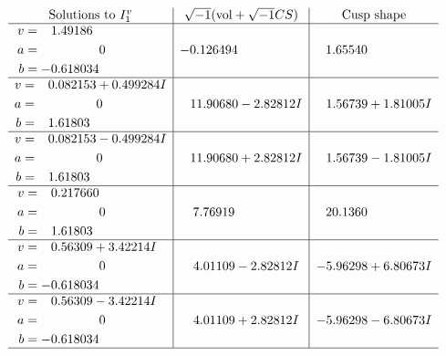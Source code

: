 \documentclass[1p]{elsarticle_modified}
\theoremstyle{definition}
\newcommand{\I}{\sqrt{-1}}
\begin{document}
$$\begin{array}{c|c|c}  
\text{Solutions to }I^v_{1}& \I (\text{vol} + \sqrt{-1}CS) & \text{Cusp shape}\\
 \hline 
\begin{aligned}
v &= \phantom{-}1.49186\phantom{ +0.000000I} \\
a &= \phantom{-0.000000 } 0 \\
b &= -0.618034\phantom{ +0.000000I}\end{aligned}
 & -0.126494\phantom{ +0.000000I} & \phantom{-}1.65540\phantom{ +0.000000I} \\ \hline\begin{aligned}
v &= \phantom{-}0.082153 + 0.499284 I \\
a &= \phantom{-0.000000 } 0 \\
b &= \phantom{-}1.61803\phantom{ +0.000000I}\end{aligned}
 & \phantom{-}11.90680 - 2.82812 I & \phantom{-}1.56739 + 1.81005 I \\ \hline\begin{aligned}
v &= \phantom{-}0.082153 - 0.499284 I \\
a &= \phantom{-0.000000 } 0 \\
b &= \phantom{-}1.61803\phantom{ +0.000000I}\end{aligned}
 & \phantom{-}11.90680 + 2.82812 I & \phantom{-}1.56739 - 1.81005 I \\ \hline\begin{aligned}
v &= \phantom{-}0.217660\phantom{ +0.000000I} \\
a &= \phantom{-0.000000 } 0 \\
b &= \phantom{-}1.61803\phantom{ +0.000000I}\end{aligned}
 & \phantom{-}7.76919\phantom{ +0.000000I} & \phantom{-}20.1360\phantom{ +0.000000I} \\ \hline\begin{aligned}
v &= \phantom{-}0.56309 + 3.42214 I \\
a &= \phantom{-0.000000 } 0 \\
b &= -0.618034\phantom{ +0.000000I}\end{aligned}
 & \phantom{-}4.01109 - 2.82812 I & -5.96298 + 6.80673 I \\ \hline\begin{aligned}
v &= \phantom{-}0.56309 - 3.42214 I \\
a &= \phantom{-0.000000 } 0 \\
b &= -0.618034\phantom{ +0.000000I}\end{aligned}
 & \phantom{-}4.01109 + 2.82812 I & -5.96298 - 6.80673 I\\
 \hline 
 \end{array}$$\newpage
\end{document}
